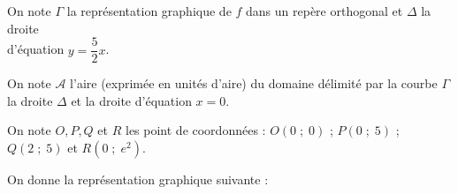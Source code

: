 \vspace*{-.1cm}

On note $\Gamma$ la représentation graphique de $f$ dans un repère orthogonal et $\Delta$ la droite \\ d'équation $y = \dfrac{5}{2}x$. \\

\vspace*{-.1cm}

On note $\mathcal{A}$ l'aire (exprimée en unités d'aire) du domaine délimité par la courbe $\Gamma$ la droite $\Delta$ et la droite d'équation $x = 0$. \\

\vspace*{-.1cm}

On note $O,P,Q$ et $R$ les point de coordonnées : $O\left(0 \;  ;\; 0\right)$ ; $P\left(0 \; ; \; 5\right)$ ; $Q\left(2 \;  ;\; 5\right)$ et $R\left(0 \; ; \; e^2\right)$. \\ 

\vspace*{-.1cm}

On donne la représentation graphique suivante : \\


